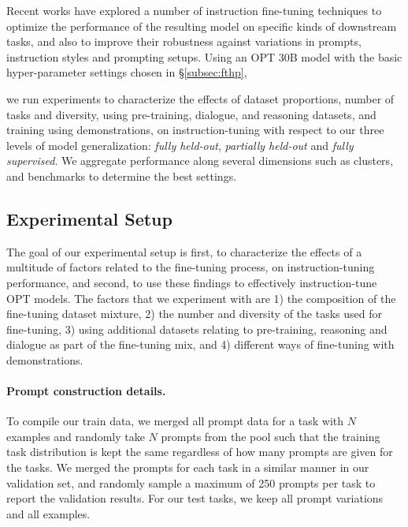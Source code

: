 Recent works have explored a number of instruction fine-tuning techniques to optimize the performance of the resulting model on specific kinds of downstream tasks, and also to improve their robustness against variations in prompts, instruction styles and prompting setups. Using an OPT 30B model with the basic hyper-parameter settings chosen in \S\ref{subsec:fthp},

we run experiments to characterize the effects of dataset proportions, number of tasks and diversity, using pre-training, dialogue, and reasoning datasets, and training using demonstrations, on instruction-tuning with respect to our three levels of model generalization: \emph{fully held-out}, \emph{partially held-out} and \emph{fully supervised}. We aggregate performance along several dimensions such as clusters, and benchmarks to determine the best settings. 

\subsection{Experimental Setup}

The goal of our experimental setup is first, to characterize the effects of a multitude of factors related to the fine-tuning process, on instruction-tuning performance, and second, to use these findings to effectively instruction-tune OPT models. The factors that we experiment with are 1) the composition of the fine-tuning dataset mixture, 2) the number and diversity of the tasks used for fine-tuning, 3) using additional datasets relating to pre-training, reasoning and dialogue as part of the fine-tuning mix, and 4) different ways of fine-tuning with demonstrations. 

\paragraph{Prompt construction details.} To compile our train data, we merged all prompt data for a task with $N$ examples and randomly take $N$ prompts from the pool such that the training task distribution is kept the same regardless of how many prompts are given for the tasks. We merged the prompts for each task in a similar manner in our validation set, and randomly sample a maximum of 250 prompts per task to report the validation results. For our test tasks, we keep all prompt variations and all examples.

